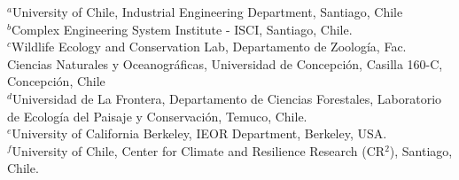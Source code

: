 \documentclass[10pt]{article}
\begin{document}
\noindent
{$^{a}$University of Chile, Industrial Engineering Department, Santiago, Chile \\
$^{b}$Complex Engineering System Institute - ISCI, Santiago, Chile. \\ 
$^{c}$Wildlife Ecology and Conservation Lab, Departamento de Zoología, Fac. Ciencias Naturales y Oceanográficas, Universidad de Concepción, Casilla 160-C, Concepción, Chile \\
$^{d}$Universidad de La Frontera, Departamento de Ciencias Forestales, Laboratorio de Ecología del Paisaje y Conservación, Temuco, Chile. \\
$^{e}$University of California Berkeley, IEOR Department, Berkeley, USA.} \\
$^{f}$University of Chile, Center for Climate and Resilience Research (CR$^{2}$), Santiago, Chile. \\
\end{document}
